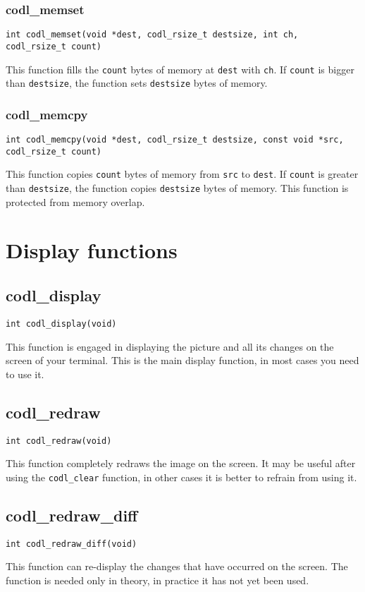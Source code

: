 \documentclass{article}
\newcommand{\fstep}{\vspace{3mm}\noindent}
\begin{document}
\subsubsection{codl\_memset}
{\tt int codl\_memset(void *dest, codl\_rsize\_t destsize, int ch, codl\_rsize\_t count)}

\fstep{} This function fills the {\tt count} bytes of memory at {\tt dest} with {\tt ch}. If
{\tt count} is bigger than {\tt destsize}, the function sets {\tt destsize} bytes of memory.

\subsubsection{codl\_memcpy}
{\tt int codl\_memcpy(void *dest, codl\_rsize\_t destsize, const void *src,
  codl\_rsize\_t count)}

\fstep{} This function copies {\tt count} bytes of memory from {\tt src} to {\tt dest}. If {\tt count}
is greater than {\tt destsize}, the function copies {\tt destsize} bytes of memory. This
function is protected from memory overlap.

\section{Display functions}
\subsection{codl\_display}
{\tt int codl\_display(void)}

\fstep{} This function is engaged in displaying the picture and all its changes
on the screen of your terminal. This is the main display function, in most cases
you need to use it.

\subsection{codl\_redraw}
{\tt int codl\_redraw(void)}

\fstep{} This function completely redraws the image on the screen.
It may be useful after using the {\tt codl\_clear} function, in other cases
it is better to refrain from using it.

\subsection{codl\_redraw\_diff}
{\tt int codl\_redraw\_diff(void)}

\fstep{} This function can re-display the changes that have occurred on the
screen. The function is needed only in theory, in practice it has not yet
been used.
\end{document}
